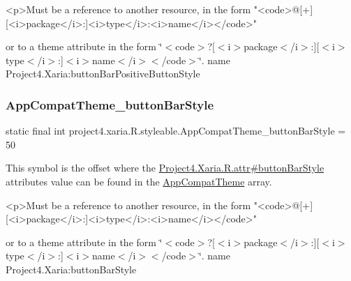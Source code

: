 \begin{DoxyVerb}      <p>Must be a reference to another resource, in the form "<code>@[+][<i>package</i>:]<i>type</i>:<i>name</i></code>"
\end{DoxyVerb}
 or to a theme attribute in the form \char`\"{}$<$code$>$?\mbox{[}$<$i$>$package$<$/i$>$\+:\mbox{]}\mbox{[}$<$i$>$type$<$/i$>$\+:\mbox{]}$<$i$>$name$<$/i$>$$<$/code$>$\char`\"{}.  name Project4.\+Xaria\+:button\+Bar\+Positive\+Button\+Style \mbox{\label{classproject4_1_1xaria_1_1R_1_1styleable_ac078eb7b75a54238baace3e740637b7f}} 
\subsubsection{\texorpdfstring{App\+Compat\+Theme\+\_\+button\+Bar\+Style}{AppCompatTheme\_buttonBarStyle}}
{\footnotesize\ttfamily static final int project4.\+xaria.\+R.\+styleable.\+App\+Compat\+Theme\+\_\+button\+Bar\+Style = 50\hspace{0.3cm}{\ttfamily [static]}}

This symbol is the offset where the \hyperlink{}{Project4.\+Xaria.\+R.\+attr\#button\+Bar\+Style} attribute\textquotesingle{}s value can be found in the \hyperlink{classproject4_1_1xaria_1_1R_1_1styleable_aad8bec413e2350f9404e6ff0e831a85d}{App\+Compat\+Theme} array.

\begin{DoxyVerb}      <p>Must be a reference to another resource, in the form "<code>@[+][<i>package</i>:]<i>type</i>:<i>name</i></code>"
\end{DoxyVerb}
 or to a theme attribute in the form \char`\"{}$<$code$>$?\mbox{[}$<$i$>$package$<$/i$>$\+:\mbox{]}\mbox{[}$<$i$>$type$<$/i$>$\+:\mbox{]}$<$i$>$name$<$/i$>$$<$/code$>$\char`\"{}.  name Project4.\+Xaria\+:button\+Bar\+Style \mbox{\label{classproject4_1_1xaria_1_1R_1_1styleable_a3fab352cdcd70d5bb2081408ab0206af}} 
